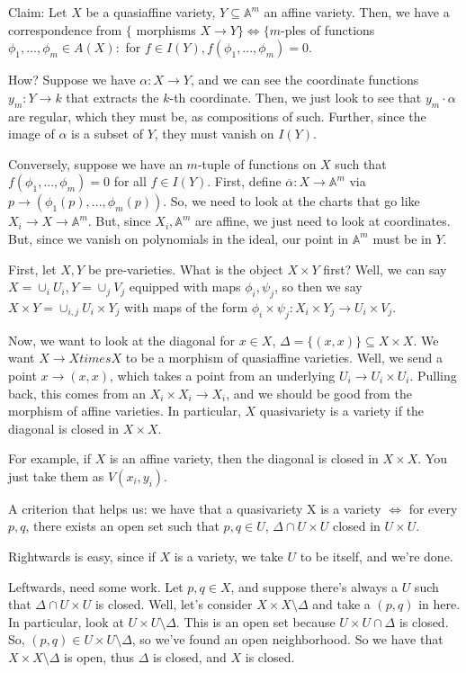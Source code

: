 \documentclass[10pt]{article}
\begin{document}
Claim: Let $X$ be a quasiaffine variety, $Y \subseteq \mathbb{A}^m$ an affine variety. Then, we have a correspondence from $\{ $ morphisms $X \to Y \} \iff \{ m$-ples of functions $\phi_1,...,\phi_m \in A(X) : $ for $f \in I(Y), f(\phi_1,...,\phi_m) = 0$. 

How? Suppose we have $\alpha: X \to Y$, and we can see the coordinate functions $y_m: Y \to k$ that extracts the $k$-th coordinate. Then, we just look to see that $y_m \cdot \alpha$ are regular, which they must be, as compositions of such. Further, since the image of $\alpha$ is a subset of $Y$, they must vanish on $I(Y)$.

Conversely, suppose we have an $m$-tuple of functions on $X$ such that $f(\phi_1,...,\phi_m) = 0$ for all $f \in I(Y)$. First, define $\overline{\alpha}: X \to \mathbb{A}^m$ via $p \to (\phi_1(p),...,\phi_m(p))$. So, we need to look at the charts that go like $X_i \to X \to \mathbb{A}^m$. But, since $X_i, \mathbb{A}^m$ are affine, we just need to look at coordinates. But, since we vanish on polynomials in the ideal, our point in $\mathbb{A}^m$ must be in $Y$. 

First, let $X,Y$ be pre-varieties. What is the object $X \times Y$ first? Well, we can say $X = \cup_i U_i, Y = \cup_j V_j$ equipped with maps $\phi_i, \psi_j$, so then we say $X \times Y = \cup_{i,j} U_i \times Y_j$ with maps of the form $\phi_i \times \psi_j: X_i \times Y_j \to U_i \times V_j$.

Now, we want to look at the diagonal for $x \in X$, $\Delta = \{ (x,x) \} \subseteq X \times X$. We want $X \to X times X$ to be a morphism of quasiaffine varieties. Well, we send a point $x \to (x,x)$, which takes a point from an underlying $U_i \to U_i \times U_i$. Pulling back, this comes from an $X_i \times X_i \to X_i$, and we should be good from the morphism of affine varieties. In particular, $X$ quasivariety is a variety if the diagonal is closed in $X \times X$.

For example, if $X$ is an affine variety, then the diagonal is closed in $X \times X$.  You just take them as $V(x_i,y_i)$.

A criterion that helps us: we have that a quasivariety X is a variety $\iff$ for every $p,q$, there exists an open set such that $p,q \in U$, $\Delta \cap U \times U$ closed in $U \times U$. 

Rightwards is easy, since if $X$ is a variety, we take $U$ to be itself, and we’re done.

Leftwards, need some work. Let $p,q \in X$, and suppose there’s always a $U$ such that $\Delta \cap U \times U$ is closed. Well, let’s consider $X \times X \setminus \Delta$ and take a $(p,q)$ in here. In particular, look at $U \times U \setminus \Delta$. This is an open set because $U \times U \cap \Delta$ is closed. So, $(p,q) \in U \times U \setminus \Delta$, so we’ve found an open neighborhood. So we have that $X \times X \setminus \Delta$ is open, thus $\Delta$ is closed, and $X$ is closed. 
\end{document}
